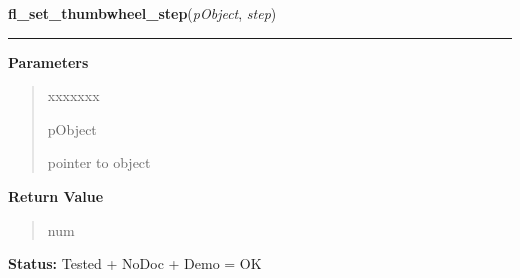     \label{xformslib:library:fl_set_thumbwheel_step}

    \vspace{0.5ex}

\hspace{.8\funcindent}\begin{boxedminipage}{\funcwidth}

    \raggedright \textbf{fl\_set\_thumbwheel\_step}(\textit{pObject}, \textit{step})

    \vspace{-1.5ex}

    \rule{\textwidth}{0.5\fboxrule}
\setlength{\parskip}{2ex}
\setlength{\parskip}{1ex}
      \textbf{Parameters}
      \vspace{-1ex}

      \begin{quote}
        \begin{Ventry}{xxxxxxx}

          \item[pObject]

          pointer to object

        \end{Ventry}

      \end{quote}

      \textbf{Return Value}
    \vspace{-1ex}

      \begin{quote}
      num

      \end{quote}

\textbf{Status:} Tested + NoDoc + Demo = OK



    \end{boxedminipage}

    \label{xformslib:library:fl_set_thumbwheel_return}

    \vspace{0.5ex}

